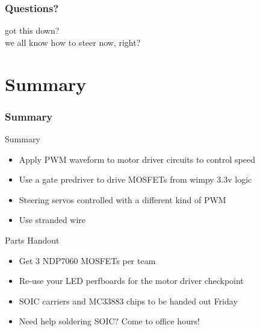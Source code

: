 \documentclass{beamer}
\begin{document}
\begin{frame}
\frametitle{Questions?}
\centering
{\huge got this down?} \\
\vspace{20px}
\tiny{we all know how to steer now, right?}
\end{frame}

\section{Summary} %

\begin{frame}
\frametitle{Summary}
Summary
\begin{itemize}
  \item Apply PWM waveform to motor driver circuits to control speed
  \item Use a gate predriver to drive MOSFETs from wimpy 3.3v logic
  \item Steering servos controlled with a different kind of PWM
  \item Use stranded wire
\end{itemize}
Parts Handout
\begin{itemize}
  \item Get 3 NDP7060 MOSFETs per team
  \item Re-use your LED perfboards for the motor driver checkpoint
  \item SOIC carriers and MC33883 chips to be handed out Friday
  \item Need help soldering SOIC? Come to office hours!
\end{itemize}
\end{frame}
\end{document}
